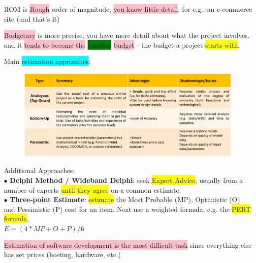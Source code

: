 \documentclass[]{project_plan}
\newcommand{\bulletPoint}{\hspace{-3.1pt}$\bullet$ \hspace{5pt}}
\begin{document}
ROM is \colorbox{pink}{Rough} order of magnitude, \colorbox{pink}{you know little detail}, for e.g., an e-commerce site (and that's it)

\colorbox{pink}{Budgetary} is more precise, you have more detail about what the project involves,
and it \colorbox{pink}{tends to become the} \colorbox{green}{baseline} \colorbox{pink}{budget} - the budget a project \colorbox{yellow}{starts with}.

\newpage

Main \colorbox{cyan}{estimation approaches}:
\begin{figure}[h!]
  \centering
  \includegraphics[width=\linewidth]{cost_estimation_approaches.png}
\end{figure}

Additional Approaches:\\
\bulletPoint \textbf{Delphi Method / Wideband Delphi}: seek \colorbox{yellow}{Expert Advice}, usually from a number of experts
\colorbox{yellow}{until they agree} on a common estimate.\\
\bulletPoint \textbf{Three-point Estimate}: \colorbox{yellow}{estimate} the Most Probable (MP), Optimistic (O) and Pessimistic (P) cost
for an item. Next use a weighted formula, e.g. the \colorbox{yellow}{PERT formula},\\
$E = (4 * MP + O + P) / 6$

\colorbox{pink}{Estimation of software development is the most difficult task} since everything else has set prices (hosting, hardware, etc.)
\end{document}

